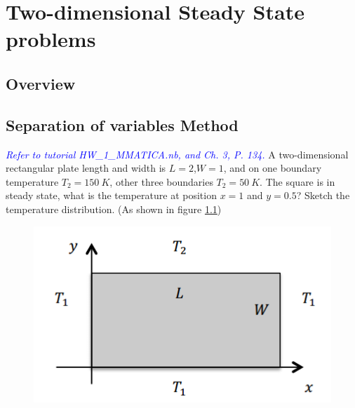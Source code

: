 \chapter{Two-dimensional Steady State problems}
\section{Overview}
\section{Separation of variables Method}
\begin{example}
\textcolor{blue} {\emph{Refer to tutorial HW\_1\_MMATICA.nb, and Ch. 3, P. 134.}}
A two-dimensional rectangular plate length and width is $L=2$,$W=1$, and on one 
boundary temperature $T_2=150~K$, other three boundaries $T_2=50~K$. The square 
is in steady state, what is the temperature at position $x=1$ and $y=0.5$?
Sketch the temperature distribution. (As shown in figure \ref{fig:3:1})
\begin{figure}[h!]
  \centering
    \includegraphics[scale=0.8]{figures/ch3/1}
    \caption{}
    \label{fig:3:1}
\end{figure}
\end{example}
